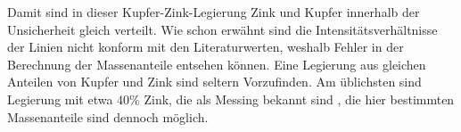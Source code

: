 Damit sind in dieser Kupfer-Zink-Legierung Zink und Kupfer innerhalb der Unsicherheit gleich verteilt. 
Wie schon erwähnt sind die Intensitätsverhältnisse der Linien nicht konform mit den Literaturwerten,
weshalb Fehler in der Berechnung der Massenanteile entsehen können. Eine Legierung aus gleichen Anteilen 
von Kupfer und Zink sind seltern Vorzufinden. Am üblichsten sind Legierung mit etwa $40\%$ Zink, die 
als Messing bekannt sind \cite{wiki:messing}, die hier bestimmten Massenanteile sind dennoch möglich.
